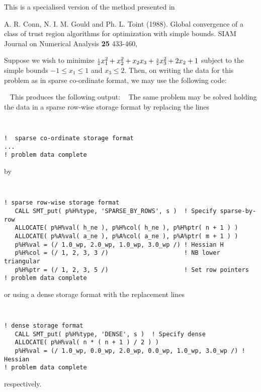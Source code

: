 \documentclass{galahad}
\begin{document}
\noindent
This is a specialised version of the method presented in 
\vspace*{1mm}

\noindent
A. R. Conn, N. I. M. Gould and Ph. L. Toint (1988).
Global convergence of a class of trust region algorithms
for optimization with simple bounds.
SIAM Journal on Numerical Analysis {\bf 25} 433-460,


\galexample
Suppose we wish to minimize
${\scriptstyle \frac{1}{2}} x_1^2 + x_2^2 + x_2 x_3 + {\scriptstyle \frac{3}{2}} x_3^2 + 2 x_2 + 1$
subject to the simple bounds
$-1  \leq  x_{1}  \leq  1$ and $x_{3}  \leq  2$.
Then, on writing the data for this problem as
in sparse co-ordinate format, we may use the following code:

{\tt \small
\VerbatimInput{\packageexample}
}
\noindent
This produces the following output:
{\tt \small
\VerbatimInput{\packageresults}
}
\noindent
The same problem may be solved holding the data in 
a sparse row-wise storage format by replacing the lines
{\tt \small
\begin{verbatim}
!  sparse co-ordinate storage format
...
! problem data complete   
\end{verbatim}
}
\noindent
by
{\tt \small
\begin{verbatim}
! sparse row-wise storage format
   CALL SMT_put( p%H%type, 'SPARSE_BY_ROWS', s )  ! Specify sparse-by-row
   ALLOCATE( p%H%val( h_ne ), p%H%col( h_ne ), p%H%ptr( n + 1 ) )
   ALLOCATE( p%A%val( a_ne ), p%A%col( a_ne ), p%A%ptr( m + 1 ) )
   p%H%val = (/ 1.0_wp, 2.0_wp, 1.0_wp, 3.0_wp /) ! Hessian H
   p%H%col = (/ 1, 2, 3, 3 /)                     ! NB lower triangular
   p%H%ptr = (/ 1, 2, 3, 5 /)                     ! Set row pointers
! problem data complete   
\end{verbatim}
}
\noindent
or using a dense storage format with the replacement lines
{\tt \small
\begin{verbatim}
! dense storage format
   CALL SMT_put( p%H%type, 'DENSE', s )  ! Specify dense
   ALLOCATE( p%H%val( n * ( n + 1 ) / 2 ) )
   p%H%val = (/ 1.0_wp, 0.0_wp, 2.0_wp, 0.0_wp, 1.0_wp, 3.0_wp /) ! Hessian
! problem data complete   
\end{verbatim}
}
\noindent
respectively.
\end{document}
